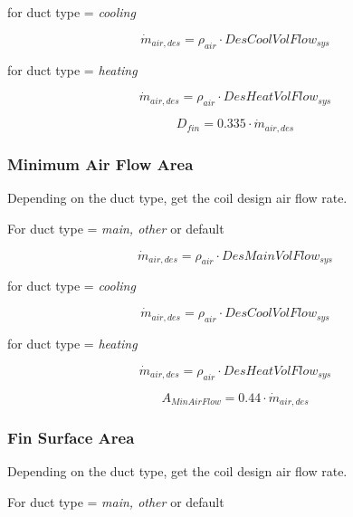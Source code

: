for duct type = \emph{cooling}

\begin{equation}
\dot m_{air,des} = \rho_{air}\cdot DesCoolVolFlow_{sys}
\end{equation}

for duct type = \emph{heating}

\begin{equation}
\dot m_{air,des} = \rho_{air} \cdot DesHeatVolFlow_{sys}
\end{equation}

\begin{equation}
D_{fin} = 0.335\cdot \dot m_{air,des}
\end{equation}

\subsubsection{Minimum Air Flow Area}\label{minimum-air-flow-area}

Depending on the duct type, get the coil design air flow rate.

For duct type = \emph{main, other} or default

\begin{equation}
\dot m_{air,des} = \rho_{air} \cdot DesMainVolFlow_{sys}
\end{equation}

for duct type = \emph{cooling}

\begin{equation}
\dot m_{air,des} = \rho_{air} \cdot DesCoolVolFlow_{sys}
\end{equation}

for duct type = \emph{heating}

\begin{equation}
\dot m_{air,des} = \rho_{air} \cdot DesHeatVolFlow_{sys}
\end{equation}

\begin{equation}
A_{MinAirFlow} = 0.44 \cdot \dot m_{air,des}
\end{equation}

\subsubsection{Fin Surface Area}\label{fin-surface-area}

Depending on the duct type, get the coil design air flow rate.

For duct type = \emph{main, other} or default

